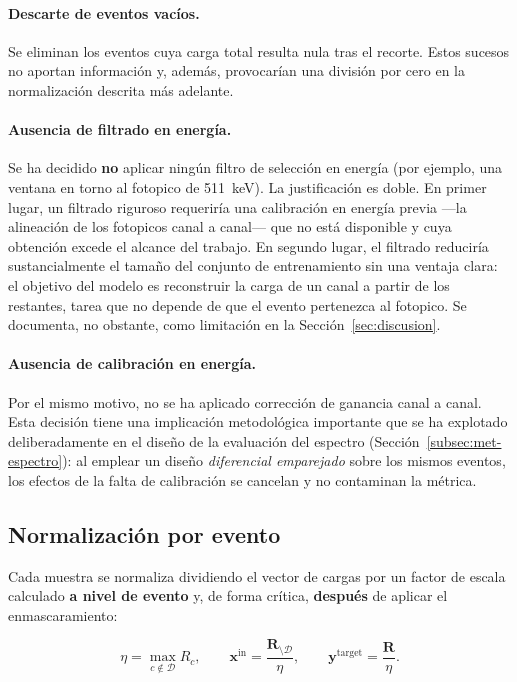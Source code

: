 \paragraph{Descarte de eventos vacíos.} Se eliminan los eventos cuya carga total resulta nula tras
el recorte. Estos sucesos no aportan información y, además, provocarían una división por cero en la
normalización descrita más adelante.

\paragraph{Ausencia de filtrado en energía.} Se ha decidido \textbf{no} aplicar ningún filtro de
selección en energía (por ejemplo, una ventana en torno al fotopico de \SI{511}{\kilo\electronvolt}).
La justificación es doble. En primer lugar, un filtrado riguroso requeriría una calibración en
energía previa ---la alineación de los fotopicos canal a canal--- que no está disponible y cuya
obtención excede el alcance del trabajo. En segundo lugar, el filtrado reduciría sustancialmente el
tamaño del conjunto de entrenamiento sin una ventaja clara: el objetivo del modelo es reconstruir la
carga de un canal a partir de los restantes, tarea que no depende de que el evento pertenezca al
fotopico. Se documenta, no obstante, como limitación en la Sección~\ref{sec:discusion}.

\paragraph{Ausencia de calibración en energía.} Por el mismo motivo, no se ha aplicado corrección de
ganancia canal a canal. Esta decisión tiene una implicación metodológica importante que se ha
explotado deliberadamente en el diseño de la evaluación del espectro
(Sección~\ref{subsec:met-espectro}): al emplear un diseño \emph{diferencial emparejado} sobre los
mismos eventos, los efectos de la falta de calibración se cancelan y no contaminan la métrica.

\subsection{Normalización por evento}
\label{subsec:normalizacion}

Cada muestra se normaliza dividiendo el vector de cargas por un factor de escala calculado
\textbf{a nivel de evento} y, de forma crítica, \textbf{después} de aplicar el enmascaramiento:

\begin{equation}
    \eta = \max_{c \notin \mathcal{D}} R_c,
    \qquad
    \mathbf{x}^{\text{in}} = \frac{\mathbf{R}_{\setminus \mathcal{D}}}{\eta},
    \qquad
    \mathbf{y}^{\text{target}} = \frac{\mathbf{R}}{\eta}.
    \label{eq:normalizacion}
\end{equation}

